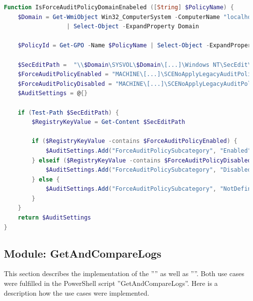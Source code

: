 \begin{lstlisting}[caption=Function IsForceAuditPolicyDomainEnabeled, language=PowerShell]
Function IsForceAuditPolicyDomainEnabeled ([String] $PolicyName) {
    $Domain = Get-WmiObject Win32_ComputerSystem -ComputerName "localhost" 
                  | Select-Object -ExpandProperty Domain

    $PolicyId = Get-GPO -Name $PolicyName | Select-Object -ExpandProperty id
    
    $SecEditPath =  "\\$Domain\SYSVOL\$Domain\[...]\Windows NT\SecEdit\GptTmpl.inf"
    $ForceAuditPolicyEnabled = "MACHINE\[...]\SCENoApplyLegacyAuditPolicy=4,1"
    $ForceAuditPolicyDisabled = "MACHINE\[...]\SCENoApplyLegacyAuditPolicy=4,0"
    $AuditSettings = @{}

    if (Test-Path $SecEditPath) {
        $RegistryKeyValue = Get-Content $SecEditPath

        if ($RegistryKeyValue -contains $ForceAuditPolicyEnabled) {
            $AuditSettings.Add("ForceAuditPolicySubcategory", "Enabled")
        } elseif ($RegistryKeyValue -contains $ForceAuditPolicyDisabled) {
            $AuditSettings.Add("ForceAuditPolicySubcategory", "Disabled")
        } else {
            $AuditSettings.Add("ForceAuditPolicySubcategory", "NotDefined")
        }
    } 
    return $AuditSettings
}
\end{lstlisting}

\clearpage

\subsection{Module: GetAndCompareLogs}
This section describes the implementation of the '''' as well as ''''. Both use cases were fulfilled in the PowerShell script ''GetAndCompareLogs''. Here is a description how the use cases were implemented.

